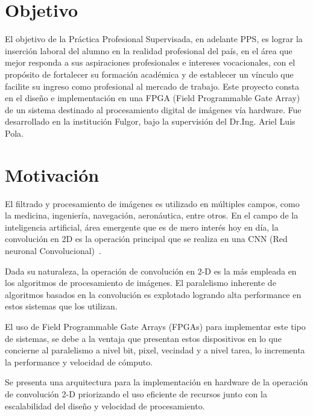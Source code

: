% 
% 
%
\section*{\small Objetivo}\label{objetivo_sec}
{\renewcommand\baselinestretch{1}\small
El objetivo de la Práctica Profesional Supervisada, en adelante PPS, es lograr
la inserción laboral del alumno en la realidad profesional del país, en el área
que mejor responda a sus aspiraciones profesionales e intereses vocacionales,
con el propósito de fortalecer su formación académica y de establecer un vínculo
que facilite su ingreso como profesional al mercado de trabajo.
Este proyecto consta en el diseño e implementación en una FPGA (Field
Programmable Gate Array) de un sistema destinado al procesamiento digital de
imágenes vía hardware.
Fue desarrollado en la institución Fulgor, bajo la supervisión del Dr.Ing. Ariel
Luis Pola. \par}

\section*{\small Motivación}\label{motiv_sec}
{\renewcommand\baselinestretch{1}\small
El filtrado y procesamiento de imágenes es utilizado en múltiples campos, como
la medicina, ingeniería, navegación, aeronáutica, entre otros. En el campo de la
inteligencia artificial, área emergente que es de mero interés hoy en día, la
convolución en 2D es la operación principal que se realiza en una CNN (Red
neuronal Convolucional)~\cite{Lecun-et-al-1998}.

Dada su naturaleza, la operación de convolución en 2-D es la más empleada en los
algoritmos de procesamiento de imágenes. El paralelismo inherente de algoritmos
basados en la convolución es explotado logrando alta performance en estos
sistemas que los utilizan.

El uso de Field Programmable Gate Arrays (FPGAs) para implementar este tipo de
sistemas, se debe a la ventaja que presentan estos dispositivos en lo que
concierne al paralelismo a nivel bit, pixel, vecindad y a nivel tarea, lo
incrementa la performance y velocidad de cómputo.~\cite{papercnn}

Se presenta una arquitectura para la implementación en hardware de la operación
de convolución 2-D priorizando el uso eficiente de recursos junto con la
escalabilidad del diseño y velocidad de procesamiento. \par}